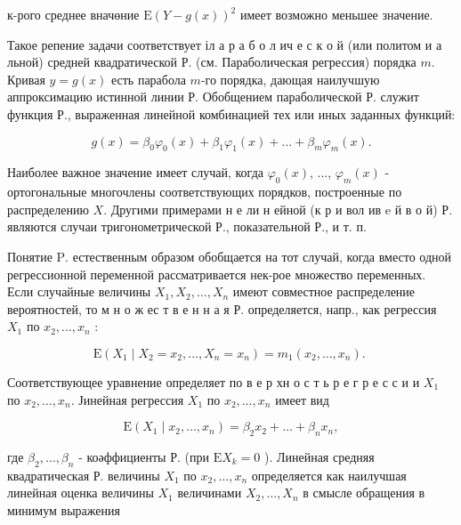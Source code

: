 \documentclass[10pt]{article}
\begin{document}
к-рого среднее вначөние $\mathrm{E}(Y-g(x))^{2}$ имеет возможно меньшее значение.



Такое репение задачи соответствует іл а р а б о л ич е с к о й (или политом и а льной) средней квадратической Р. (см. Параболическая регрессия) порядка $m$. Кривая $y=g(x)$ есть парабола $m$-го порядка, дающая наилучшую аппроксимацию истинной линии Р. Обобщением параболической Р. служит функция Р., выраженная линейной комбинацией тех или иных заданных функций:



\[

g(x)=\beta_{0} \varphi_{0}(x)+\beta_{1} \varphi_{1}(x)+\ldots+\beta_{m} \varphi_{m}(x) .

\]



Наиболее важное значение имеет случай, когда $\varphi_{0}(x)$, ..., $\varphi_{m}(x)$ - ортогональные многочлены соответствующих порядков, построенные по распределению $X$. Другими примерами н е ли н ейной (к р и вол ив $\mathrm{e}$ й в о й) Р. являются случаи тригонометрической Р., показательной Р., и т. п.



Понятие $\mathrm{P}$. естественным образом обобщается на тот случай, когда вместо одной регрессионной переменной рассматривается нек-рое множество переменных. Если случайные величины $X_{1}, X_{2}, \ldots, X_{n}$ имеют совместное распределение вероятностей, то м н о ж ес т в е н н а я Р. определяется, напр., как регрессия $X_{1}$ по $x_{2}, \ldots, x_{n}$ :



\[

\mathrm{E}\left(X_{1} \mid X_{2}=x_{2}, \ldots, X_{n}=x_{n}\right)=m_{1}\left(x_{2}, \ldots, x_{n}\right) \text {. }

\]



Соответствующее уравнение определяет по в е р хн о с т ь р е г р е с с и и $X_{1}$ по $x_{2}, \ldots, x_{n}$. Јинейная регрессия $X_{1}$ по $x_{2}, \ldots, x_{n}$ имеет вид



\[

\mathrm{E}\left(X_{1} \mid x_{2}, \ldots, x_{n}\right)=\beta_{2} x_{2}+\ldots+\beta_{n} x_{n},

\]



где $\beta_{2}, \ldots, \beta_{n}$ - коәффициенты Р. (при $\mathrm{E} X_{k}=0$ ). Линейная средняя квадратическая Р. величины $X_{1}$ по $x_{2}, \ldots, x_{n}$ определяется как наилучшая линейная оценка величины $X_{1}$ величинами $X_{2}, \ldots, X_{n}$ в смысле обращения в минимум выражения
\end{document}

